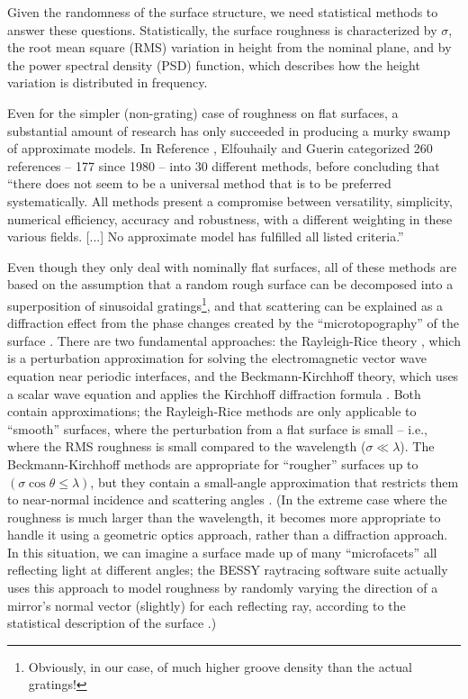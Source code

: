 Given the randomness of the surface structure, we need statistical methods to answer these questions.  Statistically, the surface roughness is characterized by $\sigma$, the root mean square (RMS) variation in height from the nominal plane, and by the power spectral density (PSD) function, which describes how the height variation is distributed in frequency.

Even for the simpler (non-grating) case of roughness on flat surfaces, a substantial amount of research has only succeeded in producing a murky swamp of approximate models.  In Reference \cite{Elf04}, Elfouhaily and Guerin categorized 260 references -- 177 since 1980 -- into 30 different methods, before concluding that ``there does not seem to be a universal method that is to be preferred systematically. All methods present a compromise between versatility, simplicity, numerical efficiency, accuracy and robustness, with a different weighting in these various fields. [...] No approximate model has fulfilled all listed criteria.''

Even though they only deal with nominally flat surfaces, all of these methods are based on the assumption that a random rough surface can be decomposed into a superposition of sinusoidal gratings\footnote{Obviously, in our case, of much higher groove density than the actual gratings!}, and that scattering can be explained as a diffraction effect from the phase changes created by the ``microtopography'' of the surface \cite{Rag07}.  There are two fundamental approaches: the Rayleigh-Rice theory \cite{Ray07} \cite{Ric51}, which is a perturbation approximation for solving the electromagnetic vector wave equation near periodic interfaces, and the Beckmann-Kirchhoff theory, which uses a scalar wave equation and applies the Kirchhoff diffraction formula \cite[Chapters 4 and 5]{Bec87}.  Both contain approximations; the Rayleigh-Rice methods are only applicable to ``smooth'' surfaces, where the perturbation from a flat surface is small -- i.e., where the RMS roughness is small compared to the wavelength ($\sigma \ll \lambda$).  The Beckmann-Kirchhoff methods are appropriate for ``rougher'' surfaces up to $(\sigma \cos \theta \leq \lambda)$, but they contain a small-angle approximation that restricts them to near-normal incidence and scattering angles \cite{Rag07}.  (In the extreme case where the roughness is much larger than the wavelength, it becomes more appropriate to handle it using a geometric optics approach, rather than a diffraction approach.  In this situation, we can imagine a surface made up of many ``microfacets'' all reflecting light at different angles; the BESSY raytracing software suite actually uses this approach to model roughness by randomly varying the direction of a mirror's normal vector (slightly) for each reflecting ray, according to the statistical description of the surface \cite{Sch}.)

